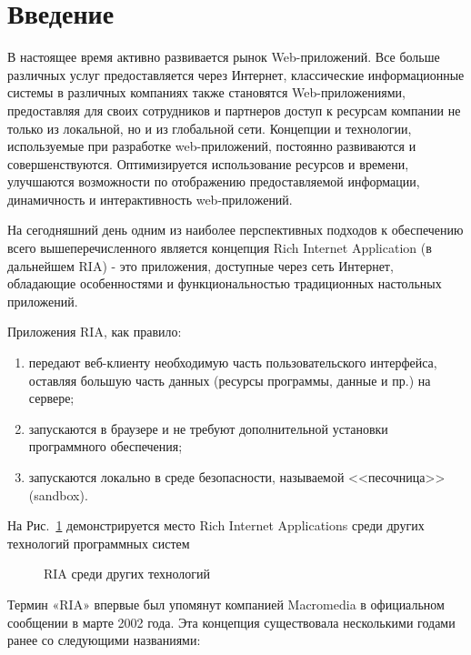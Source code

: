 \chapter*{Введение} %

В настоящее время активно развивается рынок Web-приложений. Все больше различных услуг 
предоставляется через Интернет, классические информационные системы в различных компаниях
 также становятся Web-приложениями, предоставляя для своих сотрудников и партнеров 
 доступ к ресурсам компании не только из локальной, но и из глобальной сети. Концепции 
 и технологии,  используемые при разработке web-приложений, постоянно развиваются и 
 совершенствуются.  Оптимизируется использование ресурсов и времени, улучшаются 
 возможности по отображению предоставляемой информации,  динамичность и интерактивность
  web-приложений.

На сегодняшний день одним из наиболее перспективных подходов к обеспечению всего 
вышеперечисленного является концепция Rich Internet Application (в дальнейшем RIA) - 
это приложения, доступные через сеть Интернет, обладающие  особенностями и 
функциональностью традиционных настольных приложений.
 
Приложения RIA, как правило:

\begin{enumerate}

\item передают веб-клиенту необходимую часть пользовательского   интерфейса, 
оставляя большую часть данных (ресурсы программы, данные и пр.) на сервере;
\item запускаются в браузере  и не требуют дополнительной установки программного 
обеспечения;
\item запускаются локально в среде безопасности, называемой <<песочница>>(sandbox).
\end{enumerate}

На Рис.~\ref{ris:RIAinWorld.png} демонстрируется место Rich Internet Applications 
среди других технологий программных систем
\begin{figure}[h]
\caption{RIA среди других технологий}
\label{ris:RIAinWorld.png}
\end{figure}

Термин «RIA» впервые был упомянут компанией  Macromedia в официальном сообщении в 
марте 2002 года. Эта концепция существовала несколькими годами ранее со следующими 
названиями:

